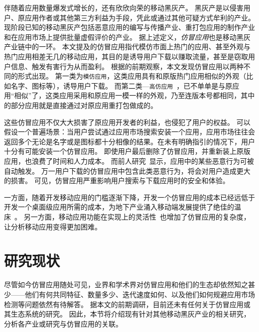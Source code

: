 伴随着应用数量爆发式增长的，还有欣欣向荣的移动黑灰产。
黑灰产是以侵害用户、原应用作者或其他第三方利益为手段，凭此或通过其他可疑方式牟利的产业。
现阶段已知的移动黑灰产包括恶意应用的编写与传播产业、重打包应用的制作产业和在应用市场上提供批量虚假评价的产业。
据上述定义，\emph{仿冒应用}也是移动黑灰产业链中的一环。
本文提及的仿冒应用指代模仿市面上热门的应用、甚至外观与热门应用相差无几的移动应用，其目的是诱导用户下载以赚取流量，甚至是窃取用户信息、触发有害行为从而盈利。
根据的前期观察，本文发现仿冒应用以两种不同的形式出现。
第一类为\texttt{模仿应用}，这类应用具有和原版热门应用相似的外观（比如名字、图标等），诱导用户下载。
而第二类---\texttt{高仿应用}~\cite{Andow2016ASO, luo2016repackage}，已不单单是与原应用``相似''了，这类应用采用和原应用一模一样的外观，乃至连版本号都相同，其中的部分应用就是直接通过对原应用重打包做成的。

这些仿冒应用不仅大大损害了原应用开发者的利益，也侵犯了用户的权益。
可以假设一个普遍场景：当用户尝试通过应用市场搜索安装一个应用，应用市场往往会返回多个无论是名字或是图标都十分相像的结果。在未有明确指引的情况下，用户十分有可能安装一个仿冒应用。
即使用户最后删除了仿冒应用，并重新装上原版应用，也浪费了时间和人力成本。
而前人研究~\cite{Zhou2012DissectingAM}显示，应用中的某些恶意行为可被自动触发。
万一用户下载的仿冒应用中包含此类恶意行为，将会对用户造成更大的损害。
可见，仿冒应用严重影响用户搜索与下载应用时的安全和体验。

一方面，随着开发移动应用的门槛逐渐下降，开发一个仿冒应用的成本已经远低于开发一个桌面级应用所需的成本，为地下产业涌入移动端发展提供了绝佳的温床~\cite{wasserman2010software}。
另一方面，移动应用功能在实现上的灵活性~\cite{storydroid}也增加了仿冒应用的复杂度，让分析移动应用变得更加困难。

\section{研究现状}
尽管如今仿冒应用随处可见，业界和学术界对仿冒应用和他们的生态却依然知之甚少——他们有何共同特征、数量多少、迭代速度如何、以及他们如何规避应用市场检测等问题依然有待解答。
据本文的前期调研，目前还未有任何关于仿冒应用或其生态系统的研究。
因此，本节将介绍现有针对其他移动黑灰产业的相关研究，分析各产业或研究与仿冒应用的关联。

